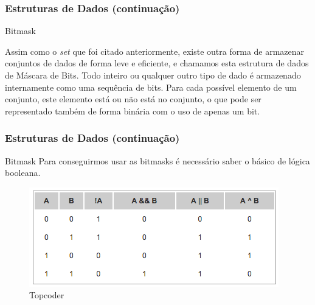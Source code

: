 
\begin{frame}
\frametitle{Estruturas de Dados (continuação)}
\begin{block}{Bitmask}
\begin{itemize}
	\bitem Assim como o \textit{set} que foi citado anteriormente, existe outra forma de armazenar conjuntos de dados de forma leve e eficiente, e chamamos esta estrutura de dados de Máscara de Bits.
	\bitem Todo inteiro ou qualquer outro tipo de dado é armazenado internamente como uma sequência de bits.
	\bitem Para cada possível elemento de um conjunto, este elemento está ou não está no conjunto, o que pode ser representado também de forma binária com o uso de apenas um bit.
\end{itemize}
\end{block}
\end{frame}

\begin{frame}
\frametitle{Estruturas de Dados (continuação)}
\begin{block}{Bitmask}
Para conseguirmos usar as bitmasks é necessário saber o básico de lógica booleana.
\begin{center}
	\begin{figure}
		\includegraphics[width=.85\textwidth]{figuras/boolean.png}
		\caption{Topcoder}
	\end{figure}
\end{center}

\end{block}

\end{frame}

